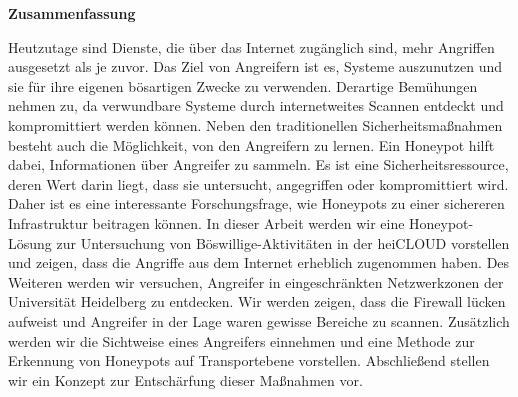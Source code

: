 \thispagestyle{empty}
\begin{center}
    \begin{minipage}[c][0.48\textheight][b]{0.9\textwidth}
        \small
        \begin{center}
            \textbf{Zusammenfassung}
        \end{center}\par
        \vspace{\baselineskip}
        Heutzutage sind Dienste, die über das Internet zugänglich sind, mehr Angriffen ausgesetzt als je zuvor.
        Das Ziel von Angreifern ist es, Systeme auszunutzen und sie für ihre eigenen bösartigen Zwecke zu verwenden.
        Derartige Bemühungen nehmen zu, da verwundbare Systeme durch internetweites Scannen entdeckt und kompromittiert werden können.
        Neben den traditionellen Sicherheitsmaßnahmen besteht auch die Möglichkeit, von den Angreifern zu lernen.
        Ein Honeypot hilft dabei, Informationen über Angreifer zu sammeln.
        Es ist eine Sicherheitsressource, deren Wert darin liegt, dass sie untersucht, angegriffen oder kompromittiert wird.
        Daher ist es eine interessante Forschungsfrage, wie Honeypots zu einer sichereren Infrastruktur beitragen können.
        In dieser Arbeit werden wir eine Honeypot-Lösung zur Untersuchung von Böswillige-Aktivitäten in der heiCLOUD vorstellen und zeigen, dass die Angriffe aus dem Internet erheblich zugenommen haben.
        Des Weiteren werden wir versuchen, Angreifer in eingeschränkten Netzwerkzonen der Universität Heidelberg zu entdecken.
        Wir werden zeigen, dass die Firewall lücken aufweist und Angreifer in der Lage waren gewisse Bereiche zu scannen.
        Zusätzlich werden wir die Sichtweise eines Angreifers einnehmen und eine Methode zur Erkennung von Honeypots auf Transportebene vorstellen.
        Abschließend stellen wir ein Konzept zur Entschärfung dieser Maßnahmen vor.
    \end{minipage}\par
    \vfill
\end{center}
